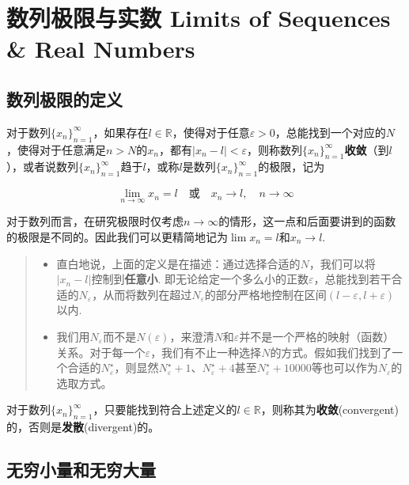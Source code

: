 \section{数列极限与实数 Limits of Sequences \& Real
Numbers}\label{ux6570ux5217ux6781ux9650ux4e0eux5b9eux6570-limits-of-sequences-real-numbers}

\subsection{数列极限的定义}\label{ux6570ux5217ux6781ux9650ux7684ux5b9aux4e49}

对于数列\(\{x_n\}_{n=1}^{\infty}\)，如果存在\(l\in\mathbb{R}\)，使得对于任意\(\varepsilon>0\)，总能找到一个对应的\(N\)，使得对于任意满足\(n>N\)的\(x_n\)，都有\(\vert x_n-l\vert <\varepsilon\)，则称数列\(\{x_n\}_{n=1}^{\infty}\)\textbf{收敛}（到\(l\)），或者说数列\(\{x_n\}_{n=1}^{\infty}\)趋于\(l\)，或称\(l\)是数列\(\{x_n\}_{n=1}^{\infty}\)的极限，记为

\[
\lim_{n\rightarrow\infty}x_n = l\quad\text{或}\quad x_n\rightarrow l,\quad n\rightarrow\infty
\]

对于数列而言，在研究极限时仅考虑\(n\rightarrow\infty\)的情形，这一点和后面要讲到的函数的极限是不同的。因此我们可以更精简地记为\(\displaystyle \lim x_n = l\)和\(x_n\rightarrow l\).

\begin{quote}
\begin{itemize}
\tightlist
\item
  直白地说，上面的定义是在描述：通过选择合适的\(N\)，我们可以将\(\vert x_n - l\vert\)控制到\textbf{任意小}.
  即无论给定一个多么小的正数\(\varepsilon\)，总能找到若干合适的\(N_\varepsilon\)，从而将数列在超过\(N_\varepsilon\)的部分严格地控制在区间\((l-\varepsilon, l+\varepsilon)\)以内.
\item
  我们用\(N_\varepsilon\)而不是\(N(\varepsilon)\)，来澄清\(N\)和\(\varepsilon\)并不是一个严格的映射（函数）关系。对于每一个\(\varepsilon\)，我们有不止一种选择\(N\)的方式。假如我们找到了一个合适的\(N^\star_\varepsilon\)，则显然\(N^\star_\varepsilon+1\)、\(N^\star_\varepsilon+4\)甚至\(N^\star_\varepsilon+10000\)等也可以作为\(N_\varepsilon\)的选取方式。
\end{itemize}
\end{quote}

对于数列\(\{x_n\}_{n=1}^{\infty}\)，只要能找到符合上述定义的\(l\in\mathbb{R}\)，则称其为\textbf{收敛}(convergent)的，否则是\textbf{发散}(divergent)的。

\subsection{无穷小量和无穷大量}\label{ux65e0ux7a77ux5c0fux91cfux548cux65e0ux7a77ux5927ux91cf}

